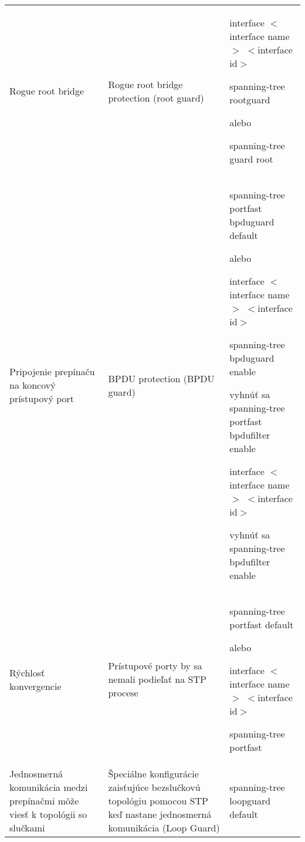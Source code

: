 \begin{longtable}[!htbp]{|L{10em}L{10em}>{\selectfont}L{34em}|}
	
	
	Rogue root bridge 	&Rogue root bridge protection (root guard)	&interface $<$interface name$>$ $<$interface id$>$
	
	\hspace{0.5em}spanning-tree rootguard
	
	\vspace{0.5em}
	{\selectfont alebo}
	\vspace{0.5em}
	
	\hspace{0.5em}spanning-tree guard root\\
	
	
	
	
	 Pripojenie prepínaču na koncový prístupový port	&BPDU protection (BPDU guard)	&spanning-tree portfast bpduguard default
	
	\vspace{0.5em}
	{\selectfont alebo}
	\vspace{0.5em}
	
	interface $<$interface name$>$ $<$interface id$>$
	
	\hspace{0.5em}spanning-tree bpduguard enable
	
	{\selectfont vyhnúť sa} spanning-tree portfast bpdufilter enable
	
	
	interface $<$interface name$>$ $<$interface id$>$
	
	{\selectfont \hspace{0.5em}vyhnúť sa} spanning-tree bpdufilter enable\\
	
	
	
	
	Rýchlosť konvergencie	&Prístupové porty by sa nemali podieľať na STP procese	&spanning-tree portfast default
	
	\vspace{0.5em}
	{\selectfont alebo}
	\vspace{0.5em}
	
	interface $<$interface name$>$ $<$interface id$>$
	
	\hspace{0.5em}spanning-tree portfast\\
	
	
	
	
	 Jednosmerná komunikácia medzi prepínačmi môže viesť k topológii so slučkami	& Špeciálne konfigurácie zaisťujúce bezslučkovú topológiu pomocou STP keď nastane jednosmerná komunikácia (Loop Guard)	&spanning-tree loopguard default
	

\end{longtable}
